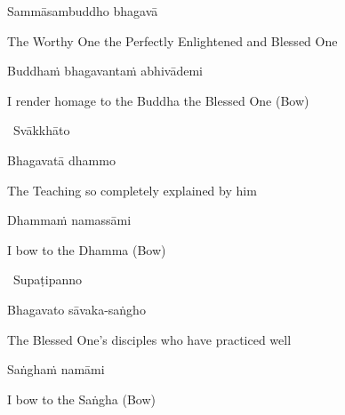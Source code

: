 \vspace{-0.5cm}

Sammāsambuddho bhagavā

\begin{english}
  The Worthy One the Perfectly Enlightened and Blessed One
\end{english}

Buddhaṁ bhagavantaṁ abhivādemi\relax

\begin{english}
  I render homage to the Buddha the Blessed One \hfill{\textnormal{\fontsize{12.5}{18}\selectfont (Bow)}}
\end{english}

\begin{leader}
  \anglebracketleft\ \hspace{-0.5mm}Svākkhāto \hspace{-0.5mm}\anglebracketright\
\end{leader}

\vspace{-0.5cm}

Bhagavatā dhammo

\begin{english}
  The Teaching so completely explained by him
\end{english}

Dhammaṁ namassāmi\relax

\begin{english}
  I bow to the Dhamma \hfill{\textnormal{\fontsize{12.5}{18}\selectfont (Bow)}}
\end{english}

\begin{leader}
  \anglebracketleft\ \hspace{-0.5mm}Supaṭipanno \hspace{-0.5mm}\anglebracketright\
\end{leader}

\vspace{-0.5cm}

Bhagavato sāvaka-saṅgho

\begin{english}
  The Blessed One's disciples who have practiced well
\end{english}

Saṅghaṁ namāmi

\begin{english}
  I bow to the Saṅgha \hfill{\textnormal{\fontsize{12.5}{18}\selectfont (Bow)}}
\end{english}

